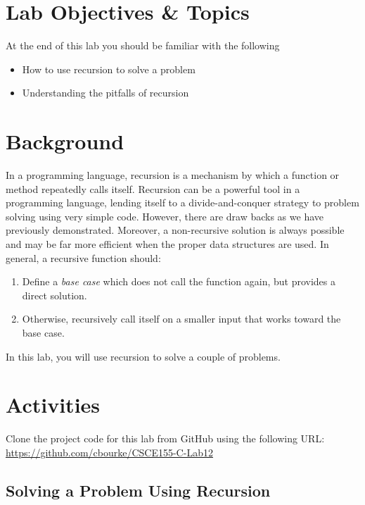 \documentclass[12pt]{scrartcl}
\begin{document}
\section{Lab Objectives \& Topics}
At the end of this lab you should be familiar with the following
\begin{itemize}
  \item How to use recursion to solve a problem
  \item Understanding the pitfalls of recursion
\end{itemize}

\section{Background}

In a programming language, recursion is a mechanism by which 
a function or method repeatedly calls itself.  Recursion can be a 
powerful tool in a programming language, lending itself to a 
divide-and-conquer strategy to problem solving using very simple 
code.  However, there are draw backs as we have previously 
demonstrated.  Moreover, a non-recursive solution is always 
possible and may be far more efficient when the proper data 
structures are used.  In general, a recursive function should:
\begin{enumerate}
  \item Define a \emph{base case} which does not call the 
	function again, but provides a direct solution.
  \item Otherwise, recursively call itself on a smaller input that 
	works toward the base case. 
\end{enumerate}
	
In this lab, you will use recursion to solve a couple of problems.

\section{Activities}

Clone the project code for this lab from GitHub using the following 
URL: \url{https://github.com/cbourke/CSCE155-C-Lab12}

\subsection{Solving a Problem Using Recursion}
\end{document}
